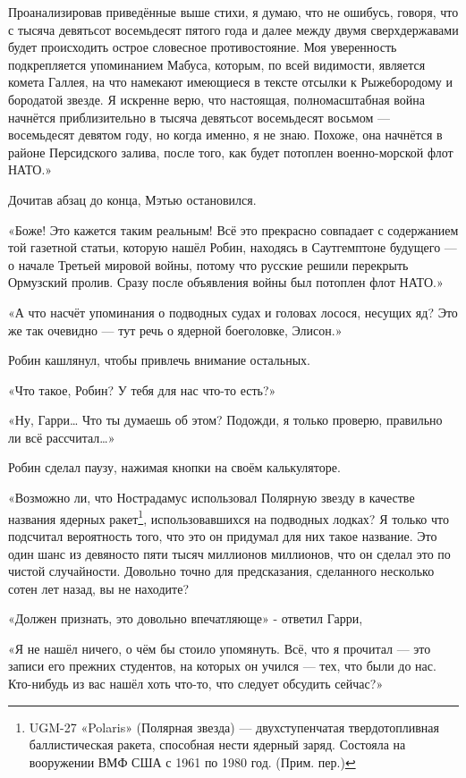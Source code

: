 \documentclass[a5paper, 9pt,
final, openany, twoside=true]{memoir}
\begin{document}
Проанализировав приведённые выше стихи, я думаю, что не ошибусь, говоря, что с тысяча девятьсот восемьдесят пятого года и далее между двумя сверхдержавами будет происходить острое словесное противостояние. Моя уверенность подкрепляется упоминанием Мабуса, которым, по всей видимости, является комета Галлея, на что намекают имеющиеся в тексте отсылки к Рыжебородому и бородатой звезде. Я искренне верю, что настоящая, полномасштабная война начнётся приблизительно в тысяча девятьсот восемьдесят восьмом — восемьдесят девятом году, но когда именно, я не знаю. Похоже, она начнётся в районе Персидского залива, после того, как будет потоплен военно-морской флот НАТО.»\bigskip

Дочитав абзац до конца, Мэтью остановился.

«Боже! Это кажется таким реальным! Всё это прекрасно совпадает с содержанием той газетной статьи, которую нашёл Робин, находясь в Саутгемптоне будущего — о начале Третьей мировой войны, потому что русские решили перекрыть Ормузский пролив. Сразу после объявления войны был потоплен флот НАТО.»

«А что насчёт упоминания о подводных судах и головах лосося, несущих яд? Это же так очевидно — тут речь о ядерной боеголовке, Элисон.»

Робин кашлянул, чтобы привлечь внимание остальных.

«Что такое, Робин? У тебя для нас что-то есть?»

«Ну, Гарри… Что ты думаешь об этом? Подожди, я только проверю, правильно ли всё рассчитал…»

Робин сделал паузу, нажимая кнопки на своём калькуляторе.

«Возможно ли, что Нострадамус использовал Полярную звезду в качестве названия ядерных ракет\footnote[1]{UGM-27 «Polaris» (Полярная звезда) — двухступенчатая твердотопливная баллистическая ракета, способная нести ядерный заряд. Состояла на вооружении ВМФ США с 1961 по 1980 год. (Прим. пер.)}, использовавшихся на подводных лодках? Я только что подсчитал вероятность того, что это он придумал для них такое название. Это один шанс из девяносто пяти тысяч миллионов миллионов, что он сделал это по чистой случайности. Довольно точно для предсказания, сделанного несколько сотен лет назад, вы не находите?

«Должен признать, это довольно впечатляюще» - ответил Гарри,

«Я не нашёл ничего, о чём бы стоило упомянуть. Всё, что я прочитал — это записи его прежних студентов, на которых он учился — тех, что были до нас. Кто-нибудь из вас нашёл хоть что-то, что следует обсудить сейчас?»
\end{document}
